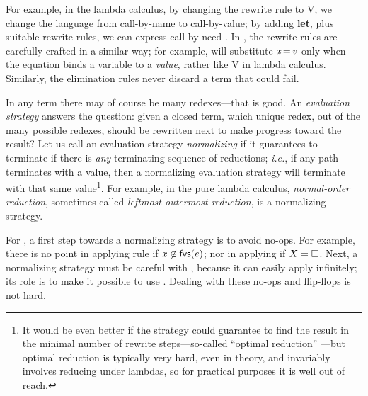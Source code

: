 \documentclass[acmsmall]{acmart}
\newcommand{\Varid}[1]{\mathit{#1}}
\newcommand{\ie}{\emph{i.e.}\xspace}	%
\begin{document}
For example, in the lambda calculus, by changing the rewrite
rule \textbeta{} to \textbeta V, we change the language from call-by-name to call-by-value; by
adding {\bf let}, plus suitable rewrite rules, we can express call-by-need \cite{ariola:call-by-need}.
In \versecalc{}, the rewrite rules are carefully crafted in a similar way; for example,  will
substitute \ensuremath{\Varid{x}\hspace{-0.14em}=\hspace{-0.14em}\Varid{v}} only when the equation binds a variable to a \emph{value}, rather like \textbeta V in
lambda calculus.  Similarly, the elimination rules never discard a term that could fail.

In any term there may of course be many redexes---that is good.
An \emph{evaluation strategy} answers the question: given a closed term, which unique redex,
out of the many possible redexes, should be rewritten next to make progress toward the result?
Let us call an evaluation strategy \emph{normalizing} if it guarantees to terminate if there
is \emph{any} terminating sequence of reductions; \ie, if any path terminates with a value,
then a normalizing evaluation strategy will terminate with that same value\footnote{
It would be even better if the strategy could guarantee to find the
result in the minimal number of rewrite steps---so-called ``optimal reduction'' \cite{levy1978reductions,lamping1989algorithm,asperti1998optimal}---but optimal reduction is typically very hard, even in theory, and
invariably involves reducing under lambdas, so for practical purposes it is well out of reach.}.
For example, in the pure lambda calculus, \emph{normal-order reduction},
sometimes called \emph{leftmost-outermost reduction}, is a normalizing strategy.

For \versecalc{}, a first step towards a normalizing strategy is to avoid no-ops.
For example, there is no point in applying rule  if $\ensuremath{\Varid{x}} \not\in \freevars{e}$;
nor in applying  if \ensuremath{X\mathrel{=}\hole}.  Next, a normalizing strategy
must be careful with , because it can easily apply infinitely;
its role is to make it possible to use .  Dealing with these
no-ops and flip-flops is not hard.
\end{document}
